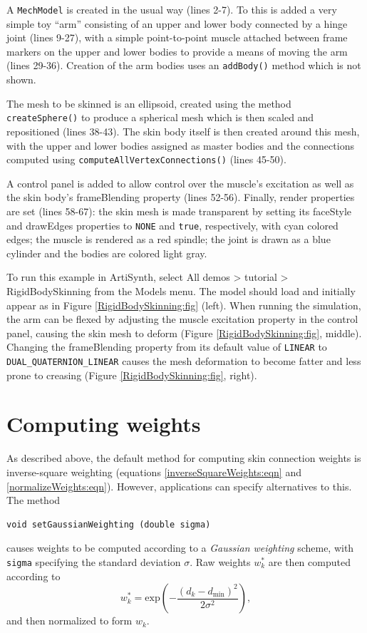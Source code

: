 A {\tt MechModel} is created in the usual way (lines 2-7).  To this is
added a very simple toy ``arm'' consisting of an upper and lower body
connected by a hinge joint (lines 9-27), with a simple
point-to-point muscle attached between frame markers on the upper and
lower bodies to provide a means of moving the arm (lines 29-36).
Creation of the arm bodies uses an {\tt addBody()} method which is not
shown.

The mesh to be skinned is an ellipsoid, created using the
 method {\tt createSphere()}
to produce a spherical mesh which is then scaled and repositioned
(lines 38-43). The skin body itself is then created around this mesh,
with the upper and lower bodies assigned as master bodies and the
connections computed using {\tt computeAllVertexConnections()} (lines
45-50).

A control panel is added to allow control over the muscle's {\sf
excitation} as well as the skin body's {\sf frameBlending} property
(lines 52-56). Finally, render properties are set (lines 58-67): the
skin mesh is made transparent by setting its {\sf faceStyle} and
{\sf drawEdges} properties to {\tt NONE} and {\tt true}, respectively,
with cyan colored edges; the muscle is rendered as a red spindle; the
joint is drawn as a blue cylinder and the bodies are colored light
gray.

To run this example in ArtiSynth, select {\sf All demos > tutorial >
RigidBodySkinning} from the {\sf Models} menu. The model should load
and initially appear as in Figure \ref{RigidBodySkinning:fig}
(left). When running the simulation, the arm can be flexed by
adjusting the muscle {\sf excitation} property in the control panel,
causing the skin mesh to deform (Figure
\ref{RigidBodySkinning:fig}, middle). Changing the
{\sf frameBlending} property from its default value of {\tt LINEAR} to
{\tt DUAL\_QUATERNION\_LINEAR} causes the mesh deformation to become
fatter and less prone to creasing (Figure
\ref{RigidBodySkinning:fig}, right).

\section{Computing weights}
\label{skinWeighting:sec}

As described above, the default method for computing skin connection
weights is inverse-square weighting (equations \ref{inverseSquareWeights:eqn}
and \ref{normalizeWeights:eqn}). However, applications can specify
alternatives to this. The method
%
\begin{lstlisting}[]
  void setGaussianWeighting (double sigma)
\end{lstlisting}
%
causes weights to be computed according to a {\it Gaussian weighting}
scheme, with {\tt sigma} specifying the standard deviation $\sigma$.
Raw weights $w^*_k$ are then computed according to
%
\begin{equation*}
w^*_k = \text{exp} \left( -\frac{(d_k - d_\text{min})^2}{2 \sigma^2} \right),
\end{equation*}
%
and then normalized to form $w_k$.

